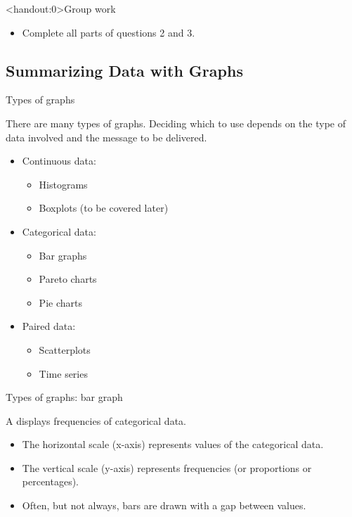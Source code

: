 \documentclass[xcolor=table, aspectratio=169, bigger, handout]{beamer}
\begin{document}
\begin{frame}<handout:0>{Group work}
\begin{block}{}
\begin{itemize}
\item Complete all parts of questions 2 and 3.
\end{itemize}
\end{block}
\end{frame}


%
%
\subsection{Summarizing Data with Graphs}

\begin{frame}{Types of graphs}

\begin{block}{}
There are many types of graphs. Deciding which to use depends on the type of data involved and the message to be delivered.

\begin{itemize}
\item Continuous data:
	\begin{itemize}
	\item Histograms
	\item Boxplots (to be covered later)
	\end{itemize}
\item Categorical data:
	\begin{itemize}
	\item Bar graphs
	\item Pareto charts
	\item Pie charts
	\end{itemize}
\item Paired data:
	\begin{itemize}
	\item Scatterplots
	\item Time series
	\end{itemize}
\end{itemize}
\end{block}
\end{frame}

\begin{frame}{Types of graphs: bar graph}
\begin{block}{}
A  displays frequencies of categorical data.
\begin{itemize}
\item The horizontal scale (x-axis) represents values of the categorical data.
\item The vertical scale (y-axis) represents frequencies (or proportions or percentages).
\item Often, but not always, bars are drawn with a gap between values.
\end{itemize}
\end{block}
\end{frame}
\end{document}
